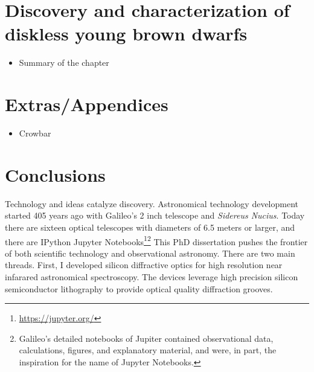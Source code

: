 \section{Discovery and characterization of diskless young brown dwarfs}

\begin{itemize}
	\item Summary of the chapter
\end{itemize}


\section{Extras/Appendices}

\begin{itemize}
	\item Crowbar
\end{itemize}

\section{Conclusions}

Technology and ideas catalyze discovery.  Astronomical technology development started 405 years ago with Galileo's 2 inch telescope and \emph{Sidereus Nucius}.  Today there are sixteen optical telescopes with diameters of 6.5 meters or larger, and there are IPython Jupyter Notebooks\footnote{\url{https://jupyter.org/}}\footnote{Galileo's detailed notebooks of Jupiter contained observational data, calculations, figures, and explanatory material, and were, in part, the inspiration for the name of Jupyter Notebooks.}  This PhD dissertation  pushes the frontier of both scientific technology and observational astronomy.  There are two main threads.  First, I developed silicon diffractive optics for high resolution near infarared astronomical spectroscopy.  The devices leverage high precision silicon semiconductor lithography to provide optical quality diffraction grooves.  